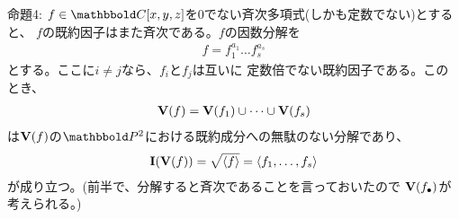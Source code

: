 \begin{framed}
  命題4:
  $f\in \C[x,y,z]$を0でない斉次多項式(しかも定数でない)とすると、
  $f$の既約因子はまた斉次である。$f$の因数分解を
  \begin{align}
    f= f_1^{a_1}\dots f_s^{a_s}
  \end{align}
  とする。ここに$i\neq j$なら、$f_i$と$f_j$は互いに
  定数倍でない既約因子である。このとき、
  \begin{align}
    \textbf V(f) = \textbf V(f_1) \cup \dots \cup \textbf V(f_s)
  \end{align}
  は$\textbf V(f)$の$\P^2$における既約成分への無駄のない分解であり、
  \begin{align}
    \textbf I(\textbf V(f))  = \sqrt{\left\langle f \right\rangle} = \left\langle f_1,\dots,f_s \right\rangle
  \end{align}
  が成り立つ。(前半で、分解すると斉次であることを言っておいたので
  $\textbf V(f_\bullet)$が考えられる。)
\end{framed}

